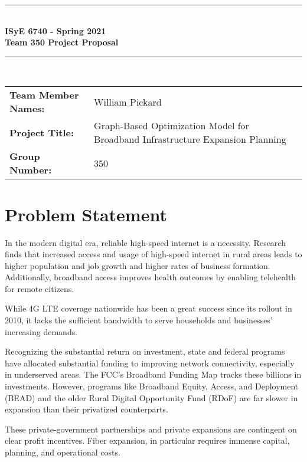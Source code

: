 \documentclass[11pt]{article}
\begin{document}
\setlength{\hsize}{0.9\hsize}%
\begin{titlepage}
	\clearpage\thispagestyle{empty}
	\centering
	\vspace{1cm}
	
	\rule{\linewidth}{1mm} \\[0.5cm]
	{ \Large \bfseries ISyE 6740 - Spring 2021\\[0.2cm]
	Team 350 Project Proposal}\\[0.5cm]
	\rule{\linewidth}{1mm} \\[1cm]
	
	\begin{tabular}{l p{5cm}}
		\textbf{Team Member Names:} & William Pickard  \\[10pt]
		\textbf{Project Title:} & Graph-Based Optimization Model for Broadband Infrastructure Expansion Planning \\[10pt]
		\textbf{Group Number:} & 350 \\[10pt]
	\end{tabular} 
\pagebreak

\end{titlepage}

\flushleft
\setlength{\parindent}{20pt}
\section{Problem Statement}

In the modern digital era, reliable high-speed internet is a necessity. Research finds that increased access and usage of high-speed internet in rural areas leads to higher population and job growth and higher rates of business formation. Additionally, broadband access improves health outcomes by enabling telehealth for remote citizens\supercite{Campbell_Castro_Wessel_2021}.

While 4G LTE coverage nationwide has been a great success since its rollout in 2010, it lacks the sufficient bandwidth to serve households and businesses' increasing demands. 

Recognizing the substantial return on investment, state and federal programs have allocated substantial funding to improving network connectivity, especially in underserved areas. The FCC's Broadband Funding Map tracks these billions in investments. However, programs like Broadband Equity, Access, and Deployment (BEAD) and the older Rural Digital Opportunity Fund (RDoF) are far slower in expansion than their privatized counterparts.

These private-government partnerships and private expansions are contingent on clear profit incentives. Fiber expansion, in particular requires immense capital, planning, and operational costs. 
\end{document}
